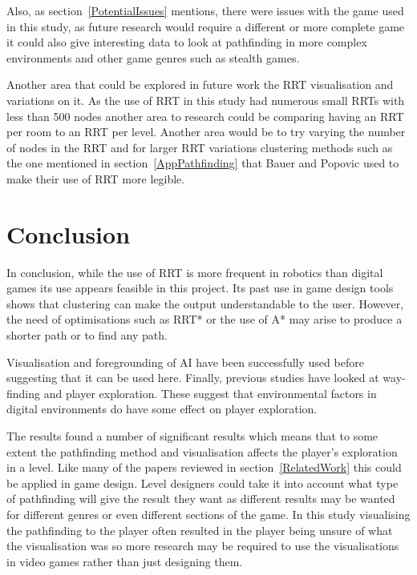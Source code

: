 \documentclass[journal]{IEEEtran}
\begin{document}
	Also, as section~\ref{PotentialIssues} mentions, there were issues with the game used in this study, as future research would require a different or more complete game it could also give interesting data to look at pathfinding in more complex environments and other game genres such as stealth games. 
	
	Another area that could be explored in future work the RRT visualisation and variations on it. As the use of RRT in this study had numerous small RRTs with less than 500 nodes another area to research could be comparing having an RRT per room to an RRT per level. Another area would be to try varying the number of nodes in the RRT and for larger RRT variations clustering methods such as the one mentioned in section~\ref{AppPathfinding} that Bauer and Popovic used to make their use of RRT more legible.
	
	\section{Conclusion} 
	In conclusion, while the use of RRT is more frequent in robotics than digital games its use appears feasible in this project. Its past use in game design tools shows that clustering can make the output understandable to the user. However, the need of optimisations such as RRT* or the use of A* may arise to produce a shorter path or to find any path. 
	
	Visualisation and foregrounding of AI have been successfully used before suggesting that it can be used here. Finally, previous studies have looked at way-finding and player exploration. These suggest that environmental factors in digital environments do have some effect on player exploration.
	
	The results found a number of significant results which means that to some extent the pathfinding method and visualisation affects the player's exploration in a level.  Like many of the papers reviewed in section~\ref{RelatedWork} this could be applied in game design. Level designers could take it into account what type of pathfinding will give the result they want as different results may be wanted for different genres or even different sections of the game. In this study visualising the pathfinding to the player often resulted in the player being unsure of what the visualisation was so more research may be required to use the visualisations in video games rather than just designing them.
	
	
	
	
\end{document}
